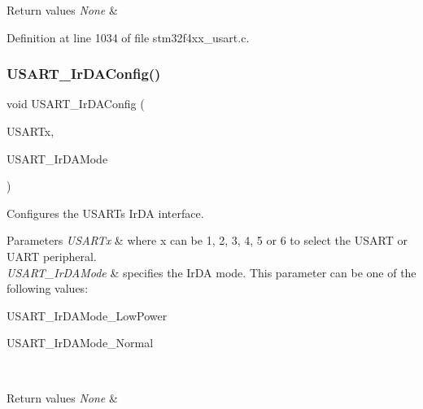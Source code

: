 \begin{DoxyRetVals}{Return values}
{\em None} & \\
\hline
\end{DoxyRetVals}


Definition at line 1034 of file stm32f4xx\+\_\+usart.\+c.

\mbox{\label{group___u_s_a_r_t_ga81a0cd36199040bf6d266b57babd678e}} 
\subsubsection{\texorpdfstring{U\+S\+A\+R\+T\+\_\+\+Ir\+D\+A\+Config()}{USART\_IrDAConfig()}}
{\footnotesize\ttfamily void U\+S\+A\+R\+T\+\_\+\+Ir\+D\+A\+Config (\begin{DoxyParamCaption}\item[{\hyperlink{struct_u_s_a_r_t___type_def}{U\+S\+A\+R\+T\+\_\+\+Type\+Def} $\ast$}]{U\+S\+A\+R\+Tx,  }\item[{uint16\+\_\+t}]{U\+S\+A\+R\+T\+\_\+\+Ir\+D\+A\+Mode }\end{DoxyParamCaption})}



Configures the U\+S\+A\+RT\textquotesingle{}s Ir\+DA interface. 


\begin{DoxyParams}{Parameters}
{\em U\+S\+A\+R\+Tx} & where x can be 1, 2, 3, 4, 5 or 6 to select the U\+S\+A\+RT or U\+A\+RT peripheral. \\
\hline
{\em U\+S\+A\+R\+T\+\_\+\+Ir\+D\+A\+Mode} & specifies the Ir\+DA mode. This parameter can be one of the following values\+: \begin{DoxyItemize}
\item U\+S\+A\+R\+T\+\_\+\+Ir\+D\+A\+Mode\+\_\+\+Low\+Power \item U\+S\+A\+R\+T\+\_\+\+Ir\+D\+A\+Mode\+\_\+\+Normal \end{DoxyItemize}
\\
\hline
\end{DoxyParams}

\begin{DoxyRetVals}{Return values}
{\em None} & \\
\hline
\end{DoxyRetVals}


